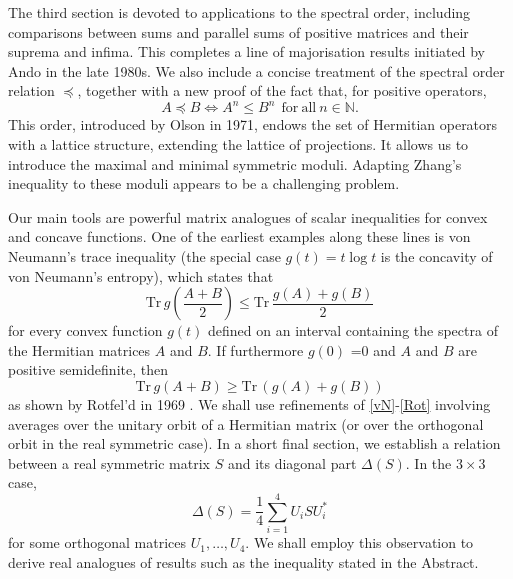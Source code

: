 \documentclass[12pt,reqno]{article}
\theoremstyle{definition}
\theoremstyle{remark}
\numberwithin{equation}{section}
\def\bN{\mathbb{N}}
\begin{document}
The third section is devoted to applications to the spectral order, including comparisons between sums and parallel sums  of positive matrices and their suprema and infima. This completes a line of majorisation results initiated by Ando in the late 1980s. We also include a concise treatment of the spectral order relation $\preceq$, together  with a new proof of the fact that, for positive operators,
$$
A\preceq B \iff  A^n\le B^n \ \ \! {\mathrm{ for\ all}}\ n\in\bN.
$$
This  order, introduced by Olson in 1971, endows the set of Hermitian operators with a lattice structure,
extending the lattice of projections. It allows us  to introduce the maximal and minimal symmetric moduli. Adapting Zhang’s inequality to these moduli
 appears to be a challenging problem.

Our main tools are powerful matrix analogues of scalar inequalities for convex and concave functions. One of the earliest examples along these lines is von Neumann's trace inequality (the special case $g(t)=t\log t$ is  the concavity of von Neumann's entropy), which states that
\begin{equation}\label{vN}
{\mathrm{Tr\,}} g\left(\frac{A+B}{2}\right) \le {\mathrm{Tr\,}}\frac{ g(A)+g(B)}{2} 
\end{equation}
for every convex function $g(t)$ defined on an interval containing the spectra of the Hermitian matrices $A$ and $B$. If furthermore $g(0)$ =0 and $A$ and $B$ are positive semidefinite, then
\begin{equation}\label{Rot}
{\mathrm{Tr\,}} g(A+B) \ge {\mathrm{Tr\,}}\! \left(g(A)+ g(B) \right)
\end{equation}
as shown by Rotfel'd in 1969 \cite{Rot}. We shall use   refinements of \eqref{vN}-\eqref{Rot} involving averages over the unitary orbit of a Hermitian matrix (or over the orthogonal orbit in the real symmetric case).  In a short final section, we establish a relation between a real symmetric matrix $S$ and its diagonal part $\Delta(S)$. In the $3\times3$ case,
$$
\Delta(S)=\frac{1}{4}\sum_{i=1}^4 U_iSU_i^*
$$
for some orthogonal matrices $U_1,\ldots, U_4$. We shall employ this  observation   to derive real analogues of results such as the inequality stated in the Abstract.
\end{document}
